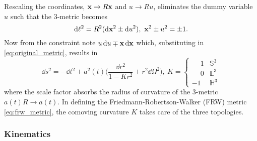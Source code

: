 Rescaling the coordinates, \(\vb{x} \rightarrow R\vb{x}\) and \(u \rightarrow Ru\), eliminates the dummy variable \(u\) such that the 3-metric becomes
%
\begin{equation}
	\dd{\ell^{2}}
	= R^{2} (\dd{\vb{x}^{2}} \pm \dd{u^{2}}),\
	\vb{x}^{2} \pm u^{2}
	= \pm 1.
\end{equation}
%
Now from the constraint note \(u\dd{u} \mp \vb{x}\dd{\vb{x}}\) which, substituting in \cref{eq:original_metric}, results in
%
\begin{equation}\label{eq:frw_metric}
	\dd{s^{2}}
	= -\dd{t^{2}} + a^{2}(t) \bigg( \frac{\dd{r^{2}}}{1-Kr^{2}} + r^{2}\dd{\Omega^{2}} \bigg),\
	K =
	\begin{cases}
		\mathbin{\phantom{-}}1 & \mathbb{S}^{3} \\
		\mathbin{\phantom{-}}0 & \mathbb{E}^{3} \\
		-1                     & \mathbb{H}^{3}
	\end{cases}
\end{equation}
%
where the scale factor absorbs the radius of curvature of the 3-metric \(a(t)R \rightarrow a(t)\).
In defining the Friedmann-Robertson-Walker (FRW) metric \cref{eq:frw_metric}, the comoving curvature \(K\) takes care of the three topologies.

\subsubsection{Kinematics}

